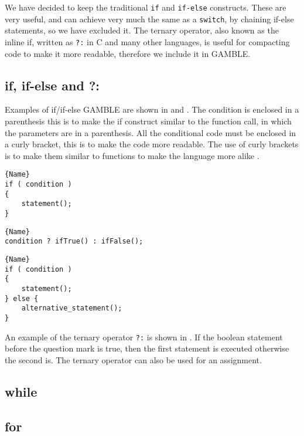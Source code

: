 We have decided to keep the traditional \texttt{if} and \texttt{if-else} constructs. 
These are very useful, and can achieve very much the same as a \texttt{switch}, by chaining if-else statements, so we have excluded it. 
The ternary operator, also known as the inline if, written as \texttt{?:} in C and many other languages, is useful for compacting code to make it more readable, therefore we include it in GAMBLE.

\subsection{if, if-else and ?:} 
Examples of if/if-else GAMBLE are shown in  and . 
The condition is enclosed in a parenthesis this is to make the if construct similar to the function call, in which the parameters are in a parenthesis. 
All the conditional code must be enclosed in a curly bracket, this is to make the code more readable. 
The use of curly brackets is to make them similar to functions to make the language more alike .

\noindent\begin{minipage}{.45\textwidth}
\begin{lstlisting}[caption=An if statement in GAMBLE.,frame=tlrb, label=iflst, numbers=none]{Name}
if ( condition )
{
    statement();
}
\end{lstlisting}
\begin{lstlisting}[caption=A use of \texttt{?:} in GAMBLE.,frame=tlrb, label=terlst, numbers=none]{Name}
condition ? ifTrue() : ifFalse();
\end{lstlisting}

\end{minipage}\hfill
\begin{minipage}{.45\textwidth}
\begin{lstlisting}[caption=An if-else statement in GAMBLE.,frame=tlrb, label=ifelselst, numbers=none]{Name}
if ( condition )
{
    statement();
} else {
    alternative_statement();
}
\end{lstlisting}
\end{minipage}

An example of the ternary operator \texttt{?:} is shown in . 
If the boolean statement before the question mark is true, then the first statement is executed otherwise the second is. 
The ternary operator can also be used for an assignment. 

\subsection{while} 
\subsection{for} 
